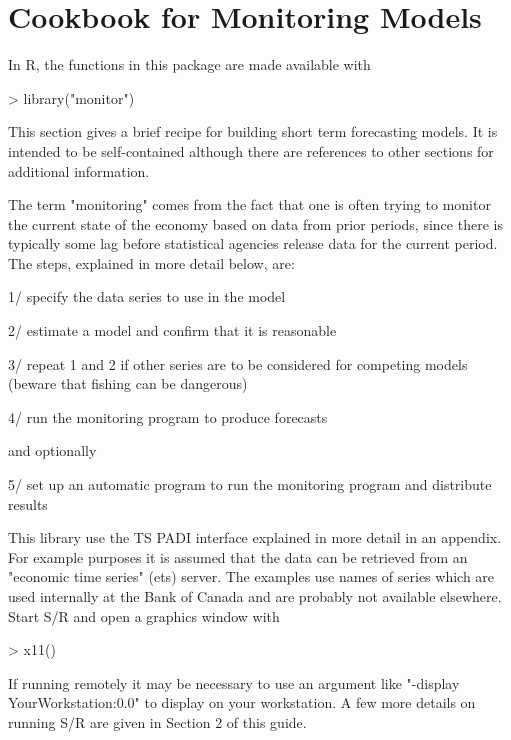 \documentclass[english]{article}
\begin{document}


\section{Cookbook for Monitoring Models}
In R, the functions in this package are made available with

\begin{Schunk}
\begin{Sinput}
> library("monitor")
\end{Sinput}
\end{Schunk}

This section gives a brief recipe for building short term forecasting
models. It is intended to be self-contained although there are references
to other sections for additional information.

The term "monitoring" comes from the fact that one is often
trying to monitor the current state of the economy based on data from
prior periods, since there is typically some lag before statistical
agencies release data for the current period. The steps, explained
in more detail below, are:


1/ specify the data series to use in the model


2/ estimate a model and confirm that it is reasonable


3/ repeat 1 and 2 if other series are to be considered for competing
models (beware that fishing can be dangerous)


4/ run the monitoring program to produce forecasts


and optionally


5/ set up an automatic program to run the monitoring program and
distribute results


This library use the TS PADI interface explained in more detail in
an appendix. For example purposes it is assumed that the data can
be retrieved from an "economic time series" (ets) server. The
examples use names of series which are used internally at the Bank
of Canada and are probably not available elsewhere. Start S/R and
open a graphics window with

\begin{Schunk}
\begin{Sinput}
> x11()
\end{Sinput}
\end{Schunk}

If running remotely it may be necessary to use an argument 
like "-display YourWorkstation:0.0" to display on your workstation. A
few more details on running S/R are given in Section 2 of this guide.
\end{document}
